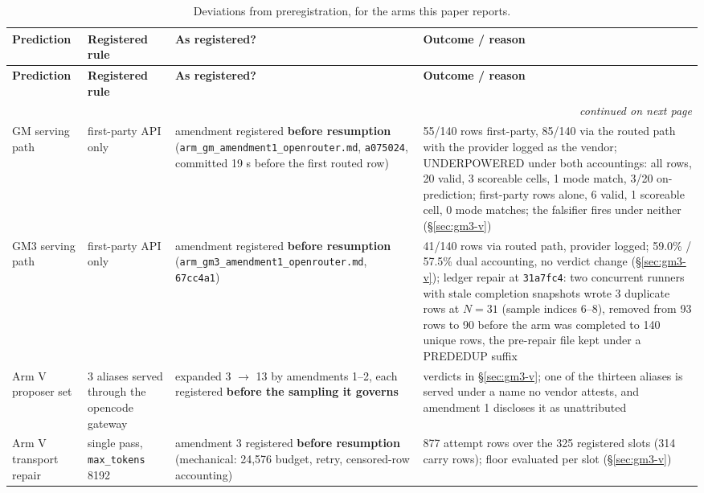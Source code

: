 \begingroup
\scriptsize
\begin{longtable}{@{}p{}p{}p{}p{}@{}}
\caption{Deviations from preregistration, for the arms this paper reports.}\label{tab:deviations}\\
\toprule
\textbf{Prediction} & \textbf{Registered rule} & \textbf{As registered?} & \textbf{Outcome / reason} \\
\midrule
\endfirsthead
\toprule
\textbf{Prediction} & \textbf{Registered rule} & \textbf{As registered?} & \textbf{Outcome / reason} \\
\midrule
\endhead
\midrule
\multicolumn{4}{r}{\emph{continued on next page}} \\
\endfoot
\bottomrule
\endlastfoot
GM serving path & first-party API only & amendment registered \textbf{before resumption} (\texttt{arm\_gm\_\bk{}amendment1\_\bk{}openrouter.md}, \texttt{a075024}, committed 19 s before the first routed row) & 55/140 rows first-party, 85/140 via the routed path with the provider logged as the vendor; UNDERPOWERED under both accountings: all rows, 20 valid, 3 scoreable cells, 1 mode match, 3/20 on-prediction; first-party rows alone, 6 valid, 1 scoreable cell, 0 mode matches; the falsifier fires under neither (\S\ref{sec:gm3-v}) \\
GM3 serving path & first-party API only & amendment registered \textbf{before resumption} (\texttt{arm\_gm3\_\bk{}amendment1\_\bk{}openrouter.md}, \texttt{67cc4a1}) & 41/140 rows via routed path, provider logged; 59.0\% / 57.5\% dual accounting, no verdict change (\S\ref{sec:gm3-v}); ledger repair at \texttt{31a7fc4}: two concurrent runners with stale completion snapshots wrote 3 duplicate rows at $N = 31$ (sample indices 6--8), removed from 93 rows to 90 before the arm was completed to 140 unique rows, the pre-repair file kept under a PREDEDUP suffix \\
Arm V proposer set & 3 aliases served through the opencode gateway & expanded 3 $\rightarrow$ 13 by amendments 1--2, each registered \textbf{before the sampling it governs} & verdicts in \S\ref{sec:gm3-v}; one of the thirteen aliases is served under a name no vendor attests, and amendment 1 discloses it as unattributed \\
Arm V transport repair & single pass, \texttt{max\_tokens} 8192 & amendment 3 registered \textbf{before resumption} (mechanical: 24,576 budget, retry, censored-row accounting) & 877 attempt rows over the 325 registered slots (314 carry rows); floor evaluated per slot (\S\ref{sec:gm3-v}) \\

\end{longtable}
